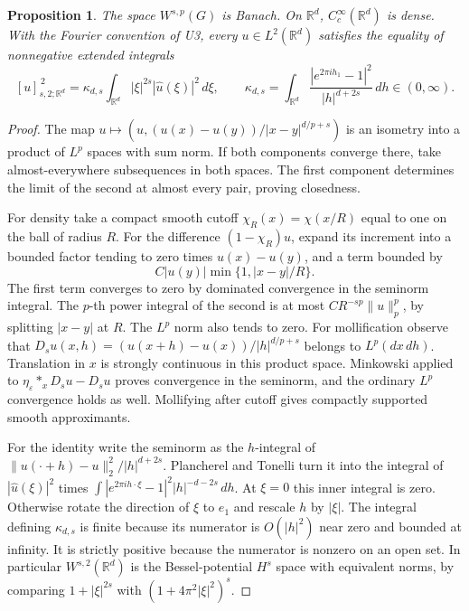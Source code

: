 \documentclass[11pt,oneside,openany]{book}
\newtheorem{proposition}[theorem]{Proposition}
\theoremstyle{definition}
\theoremstyle{remark}
\begin{document}
\begin{proposition}
The space \(W^{s,p}(G)\) is Banach. On \(\mathbb R^d\),
\(C_c^\infty(\mathbb R^d)\) is dense. With the Fourier convention of U3,
every \(u\in L^2(\mathbb R^d)\) satisfies the equality of
nonnegative extended integrals
\[
 [u]_{s,2;\mathbb R^d}^{\,2}
 =\kappa_{d,s}\int_{\mathbb R^d}|\xi|^{2s}|\widehat u(\xi)|^2\,d\xi,
 \qquad
 \kappa_{d,s}=
 \int_{\mathbb R^d}\frac{|e^{2\pi i h_1}-1|^2}{|h|^{d+2s}}\,dh
 \in(0,\infty).
\]
\end{proposition}
\begin{proof}
The map \(u\mapsto(u,(u(x)-u(y))/|x-y|^{d/p+s})\) is an isometry
into a product of \(L^p\) spaces with sum norm. If both components
converge there, take almost-everywhere subsequences in both spaces.
The first component determines the limit of the second at almost
every pair, proving closedness.

For density take a compact smooth cutoff \(\chi_R(x)=\chi(x/R)\)
equal to one on the ball of radius \(R\). For the difference
\((1-\chi_R)u\), expand its increment into a bounded factor
tending to zero times \(u(x)-u(y)\), and a term bounded by
\[
 C |u(y)|\min\{1,|x-y|/R\}.
\]
The first term converges to zero by dominated convergence in the
seminorm integral. The \(p\)-th power integral of the second is
at most \(CR^{-sp}\|u\|_p^p\), by splitting \(|x-y|\) at \(R\).
The \(L^p\) norm also tends to zero. For mollification observe that
\(D_su(x,h)=(u(x+h)-u(x))/|h|^{d/p+s}\) belongs to
\(L^p(dx\,dh)\). Translation in \(x\) is strongly continuous in this
product space. Minkowski applied to
\(\eta_\varepsilon*_x D_su-D_su\) proves convergence in the
seminorm, and the ordinary \(L^p\) convergence holds as well.
Mollifying after cutoff gives compactly supported smooth approximants.

For the identity write the seminorm as the \(h\)-integral of
\(\|u(\cdot+h)-u\|_2^2/|h|^{d+2s}\).
Plancherel and Tonelli turn it into the integral of
\(|\widehat u(\xi)|^2\) times
\(\int |e^{2\pi i h\cdot\xi}-1|^2|h|^{-d-2s}\,dh\).
At \(\xi=0\) this inner integral is zero. Otherwise rotate the
direction of \(\xi\) to \(e_1\) and rescale \(h\) by \(|\xi|\).
The integral defining \(\kappa_{d,s}\) is finite because its
numerator is \(O(|h|^2)\) near zero and bounded at infinity.
It is strictly positive because the numerator is nonzero on
an open set. In particular \(W^{s,2}(\mathbb R^d)\) is the
Bessel-potential \(H^s\) space with equivalent norms, by comparing
\(1+|\xi|^{2s}\) with \((1+4\pi^2|\xi|^2)^s\).
\end{proof}
\end{document}
